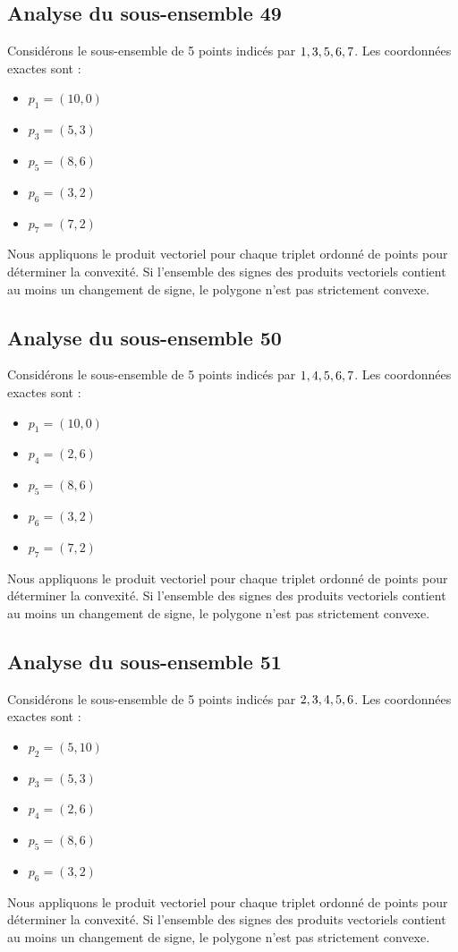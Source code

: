 \documentclass[11pt]{article}
\begin{document}
\subsection{Analyse du sous-ensemble 49}
Considérons le sous-ensemble de 5 points indicés par $\\{ 1, 3, 5, 6, 7 \\}$.
Les coordonnées exactes sont :
\begin{itemize}
\item $p_1 = (10, 0)$
\item $p_3 = (5, 3)$
\item $p_5 = (8, 6)$
\item $p_6 = (3, 2)$
\item $p_7 = (7, 2)$
\end{itemize}
Nous appliquons le produit vectoriel pour chaque triplet ordonné de points pour déterminer la convexité. Si l'ensemble des signes des produits vectoriels contient au moins un changement de signe, le polygone n'est pas strictement convexe.
\newpage

\subsection{Analyse du sous-ensemble 50}
Considérons le sous-ensemble de 5 points indicés par $\\{ 1, 4, 5, 6, 7 \\}$.
Les coordonnées exactes sont :
\begin{itemize}
\item $p_1 = (10, 0)$
\item $p_4 = (2, 6)$
\item $p_5 = (8, 6)$
\item $p_6 = (3, 2)$
\item $p_7 = (7, 2)$
\end{itemize}
Nous appliquons le produit vectoriel pour chaque triplet ordonné de points pour déterminer la convexité. Si l'ensemble des signes des produits vectoriels contient au moins un changement de signe, le polygone n'est pas strictement convexe.
\newpage

\subsection{Analyse du sous-ensemble 51}
Considérons le sous-ensemble de 5 points indicés par $\\{ 2, 3, 4, 5, 6 \\}$.
Les coordonnées exactes sont :
\begin{itemize}
\item $p_2 = (5, 10)$
\item $p_3 = (5, 3)$
\item $p_4 = (2, 6)$
\item $p_5 = (8, 6)$
\item $p_6 = (3, 2)$
\end{itemize}
Nous appliquons le produit vectoriel pour chaque triplet ordonné de points pour déterminer la convexité. Si l'ensemble des signes des produits vectoriels contient au moins un changement de signe, le polygone n'est pas strictement convexe.
\newpage
\end{document}
